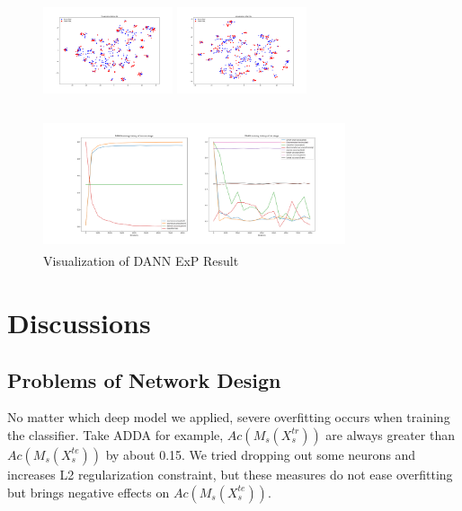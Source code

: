 \documentclass[conference]{IEEEtran}
\begin{document}
\begin{figure}[htb]
\centering
\begin{minipage}[t]{0.2\textwidth}
\includegraphics[width=1.5in, height=1.5in]{Ldann/std_P2R/before.png}
\end{minipage}%
\begin{minipage}[t]{0.2\textwidth}
\includegraphics[width=1.5in, height=1.5in]{Ldann/std_P2R/after.png}
\end{minipage}%
\begin{minipage}[t]{0.45\textwidth}
\includegraphics[width=3.5in, height=1.5in]{Ldann/std_P2R/dann.png}
\end{minipage}%
\caption{Visualization of DANN ExP Result}\label{fig:ExP2}
\end{figure}

\section{Discussions}
\subsection{Problems of Network Design}
No matter which deep model we applied, severe overfitting occurs when training the classifier. Take ADDA for example, $Ac(M_s(X^{tr}_s))$ are always greater than $Ac(M_s(X^{te}_s))$ by about 0.15. We tried dropping out some neurons and increases L2 regularization constraint, but these measures do not ease overfitting but brings negative effects on $Ac(M_s(X^{te}_s))$.
\end{document}
